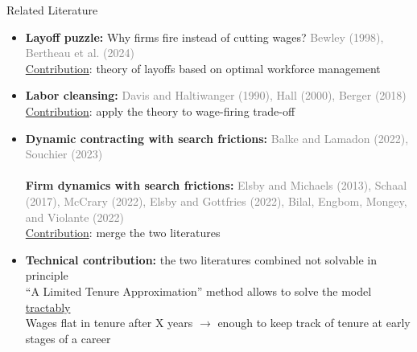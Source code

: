 \documentclass[9pt,aspectratio=169]{beamer} %
\begin{document}
\begin{frame}{Related Literature}
\hypertarget{LTA}{}
\begin{itemize}
    \item \textbf{Layoff puzzle:} Why firms fire instead of cutting wages? \textcolor{gray}{Bewley (1998), Bertheau et al. (2024)} \\
    \underline{Contribution}: theory of layoffs based on optimal workforce management
\end{itemize}
\medskip
\begin{itemize}
    \item \textbf{Labor cleansing:} \textcolor{gray}{Davis and Haltiwanger (1990), Hall (2000), Berger (2018)} \\
     \underline{Contribution}: apply the theory to wage-firing trade-off
\end{itemize}
\pause
\bigskip
\begin{itemize}
    \item \textbf{Dynamic contracting with search frictions:} \textcolor{gray}{Balke and Lamadon (2022), Souchier (2023)} \\
\\
    \textbf{Firm dynamics with search frictions:}
    \textcolor{gray}{Elsby and Michaels (2013), Schaal (2017), McCrary (2022), Elsby and Gottfries (2022), Bilal, Engbom, Mongey, and Violante (2022)}  \\

   \underline{Contribution}: merge the two literatures
\\
    
\end{itemize}
\pause
    \bigskip
    \begin{itemize}
        \item \textbf{Technical contribution:} the two literatures combined not solvable in principle \\
        ``A Limited Tenure Approximation” method allows to solve the model \underline{tractably} \\
 Wages flat in tenure after X years $\rightarrow$ enough to keep track of tenure at early stages of a career \hyperlink{Wage growth}{}
    \end{itemize}
\end{frame}
\end{document}
